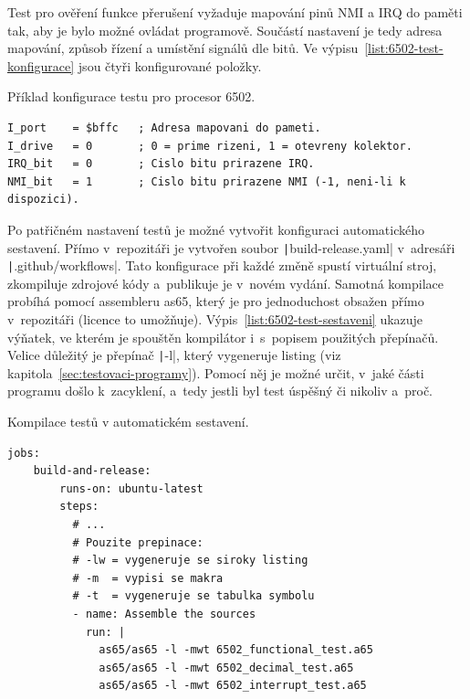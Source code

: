 Test pro ověření funkce přerušení vyžaduje mapování pinů NMI a IRQ do paměti tak, aby je bylo možné ovládat programově. Součástí nastavení je tedy adresa mapování, způsob řízení a umístění signálů dle bitů. Ve výpisu~\ref{list:6502-test-konfigurace} jsou čtyři konfigurované položky.

\begin{listing}[ht!]
	\caption{Příklad konfigurace testu pro procesor 6502.}
	\label{list:6502-test-konfigurace}
	\begin{verbatim}
I_port    = $bffc   ; Adresa mapovani do pameti.
I_drive   = 0       ; 0 = prime rizeni, 1 = otevreny kolektor.
IRQ_bit   = 0       ; Cislo bitu prirazene IRQ.
NMI_bit   = 1       ; Cislo bitu prirazene NMI (-1, neni-li k dispozici).
	\end{verbatim}
\end{listing}

Po patřičném nastavení testů je možné vytvořit konfiguraci automatického sestavení. Přímo v~repozitáři je vytvořen soubor \texttt|build-release.yaml| v~adresáři \texttt|.github/workflows|. Tato konfigurace při každé změně spustí virtuální stroj, zkompiluje zdrojové kódy a~publikuje je v~novém vydání. Samotná kompilace probíhá pomocí assembleru as65, který je pro jednoduchost obsažen přímo v~repozitáři (licence to umožňuje). Výpis~\ref{list:6502-test-sestaveni} ukazuje výňatek, ve kterém je spouštěn kompilátor i~s~popisem použitých přepínačů. Velice důležitý je přepínač \texttt|-l|, který vygeneruje listing (viz kapitola~\ref{sec:testovaci-programy}). Pomocí něj je možné určit, v~jaké části programu došlo k~zacyklení, a~tedy jestli byl test úspěšný či nikoliv a~proč.

\begin{listing}[ht!]
	\caption{Kompilace testů v automatickém sestavení.}
	\label{list:6502-test-sestaveni}
	\begin{verbatim}
jobs:
    build-and-release:
        runs-on: ubuntu-latest
        steps:
          # ...
          # Pouzite prepinace:
          # -lw = vygeneruje se siroky listing
          # -m  = vypisi se makra
          # -t  = vygeneruje se tabulka symbolu
          - name: Assemble the sources
            run: |
              as65/as65 -l -mwt 6502_functional_test.a65
              as65/as65 -l -mwt 6502_decimal_test.a65
              as65/as65 -l -mwt 6502_interrupt_test.a65
	\end{verbatim}
\end{listing}

